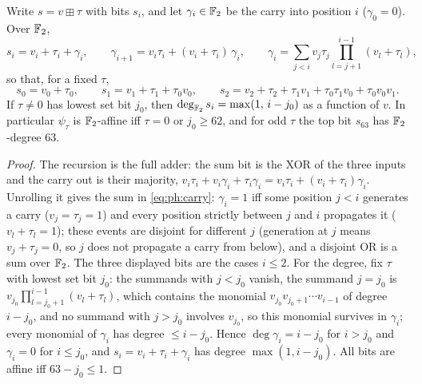 \begin{proposition}\label{prop:ph:twist-bits}
Write $s=v\boxplus \tau$ with bits $s_i$, and let $\gamma_i\in\mathbb{F}_2$ be the carry
into position $i$ ($\gamma_0=0$).  Over $\mathbb{F}_2$,
\begin{equation}\label{eq:ph:carry}
  s_i=v_i+\tau_i+\gamma_i,\qquad
  \gamma_{i+1}=v_i\tau_i+(v_i+\tau_i)\,\gamma_i,\qquad
  \gamma_i=\sum_{j<i}v_j\tau_j\prod_{l=j+1}^{i-1}(v_l+\tau_l),
\end{equation}
so that, for a fixed $\tau$,
\[
  s_0=v_0+\tau_0,\qquad
  s_1=v_1+\tau_1+\tau_0v_0,\qquad
  s_2=v_2+\tau_2+\tau_1v_1+\tau_0\tau_1v_0+\tau_0v_0v_1 .
\]
If $\tau\ne0$ has lowest set bit $j_0$, then $\deg_{\mathbb{F}_2}s_i=\max(1,\,i-j_0)$
as a function of $v$.  In particular $\psi_\tau$ is $\mathbb{F}_2$-affine iff $\tau=0$ or
$j_0\ge62$, and for odd $\tau$ the top bit $s_{63}$ has $\mathbb{F}_2$-degree $63$.
\end{proposition}
\begin{proof}
The recursion is the full adder: the sum bit is the XOR of the three inputs
and the carry out is their majority,
$v_i\tau_i+v_i\gamma_i+\tau_i\gamma_i=v_i\tau_i+(v_i+\tau_i)\gamma_i$.  Unrolling it
gives the sum in \eqref{eq:ph:carry}: $\gamma_i=1$ iff some position $j<i$
generates a carry ($v_j=\tau_j=1$) and every position strictly between $j$ and
$i$ propagates it ($v_l+\tau_l=1$); these events are disjoint for different
$j$ (generation at $j$ means $v_j+\tau_j=0$, so $j$ does not propagate a carry
from below), and a disjoint OR is a sum over $\mathbb{F}_2$.  The three displayed
bits are the cases $i\le2$.  For the degree, fix $\tau$ with lowest set bit
$j_0$: the summands with $j<j_0$ vanish, the summand $j=j_0$ is
$v_{j_0}\prod_{l=j_0+1}^{i-1}(v_l+\tau_l)$, which contains the monomial
$v_{j_0}v_{j_0+1}\cdots v_{i-1}$ of degree $i-j_0$, and no summand with
$j>j_0$ involves $v_{j_0}$, so this monomial survives in $\gamma_i$; every
monomial of $\gamma_i$ has degree $\le i-j_0$.  Hence
$\deg\gamma_i=i-j_0$ for $i>j_0$ and $\gamma_i=0$ for $i\le j_0$, and
$s_i=v_i+\tau_i+\gamma_i$ has degree $\max(1,i-j_0)$.  All bits are affine iff
$63-j_0\le1$.
\end{proof}

